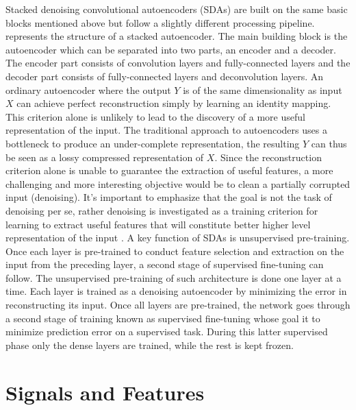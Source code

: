 Stacked denoising convolutional autoencoders (SDAs) are built on the same basic blocks mentioned above but follow a slightly different processing pipeline.  represents the structure of a stacked autoencoder. The main building block is the autoencoder which can be separated into two parts, an encoder and a decoder. The encoder part consists of convolution layers and \mbox{fully-connected} layers and the decoder part consists of \mbox{fully-connected} layers and deconvolution layers. An ordinary autoencoder where the output $Y$ is of the same dimensionality as input $X$ can achieve perfect reconstruction simply by learning an identity mapping. This criterion alone is unlikely to lead to the discovery of a more useful representation of the input. The traditional approach to autoencoders uses a bottleneck to produce an \mbox{under-complete} representation, the resulting $Y$ can thus be seen as a lossy compressed representation of $X$. Since the reconstruction criterion alone is unable to guarantee the extraction of useful features, a more challenging and more interesting objective would be to clean a partially corrupted input (denoising). It's important to emphasize that the goal is not the task of denoising per se, rather denoising is investigated as a training criterion for learning to extract useful features that will constitute better higher level representation of the input \cite{Pascal-2010}. A key function of SDAs is unsupervised \mbox{pre-training}. Once each layer is \mbox{pre-trained} to conduct feature selection and extraction on the input from the preceding layer, a second stage of supervised \mbox{fine-tuning} can follow. The unsupervised \mbox{pre-training} of such architecture is done one layer at a time. Each layer is trained as a denoising autoencoder by minimizing the error in reconstructing its input. Once all layers are \mbox{pre-trained}, the network goes through a second stage of training known as supervised \mbox{fine-tuning} whose goal it to minimize prediction error on a supervised task. During this latter supervised phase only the dense layers are trained, while the rest is kept frozen.






\section{Signals and Features}
\label{sec:signals_features}

